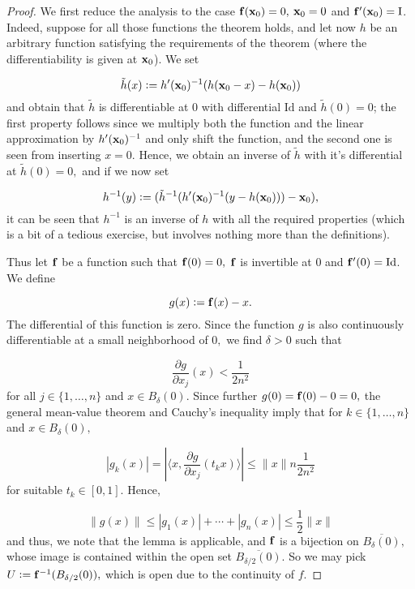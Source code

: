 \begin{proof}
We first reduce the analysis  to the case \(\mathbf{ f}(\mathbf{ x}_0) = 0,\) \(\mathbf{ x}_0 = 0\) and
\(\mathbf{ f}'(\mathbf{ x}_0) = \text{I}\). Indeed, suppose for all those functions the
theorem holds, and let now \(h\) be an arbitrary function satisfying the
requirements of the theorem (where the differentiability is given at
\(\mathbf{ x}_0\)). We set

\[\tilde h(x) := h'(\mathbf{ x}_0)^{-1}(h(\mathbf{ x}_0 - x) - h(\mathbf{ x}_0))\] and obtain that
\(\tilde h\) is differentiable at \(0\) with differential \(\text{Id}\)
and \(\tilde h(0) = 0\); the first property follows since we multiply
both the function and the linear approximation by
\(h'(\mathbf{ x}_0)^{-1}\) and only shift the function, and the second one is seen
from inserting \(x = 0\). Hence, we obtain an inverse of \(\tilde h\)
with it's differential at \(\tilde h(0) = 0,\) and if we now set

\[h^{-1}(y) :=  (\tilde h^{-1} (h'(\mathbf{ x}_0)^{-1}(y - h(\mathbf{ x}_0))) - \mathbf{ x}_0),\] it
can be seen that \(h^{-1}\) is an inverse of \(h\) with all the required
properties (which is a bit of a tedious exercise, but involves nothing
more than the definitions).

Thus let \(\mathbf{ f}\) be a function such that \(\mathbf{ f}(0) = 0,\) \(\mathbf{ f}\) is invertible
at \(0\) and \(\mathbf{ f}'(0) = \text{Id}\). We define

\[g(x) := \mathbf{ f}(x) - x.\] The differential of this function is zero. Since the function \(g\) is also
continuously differentiable at a small neighborhood of \(0,\) we find
\(\delta > 0\) such that

\[\frac{\partial g}{\partial x_j}(x) < \frac{1}{2n^2}\] for all
\(j \in \{1, \ldots, n\}\) and \(x \in B_\delta(0)\). Since further
\(g(0) = \mathbf{ f}(0) - 0 = 0,\) the general mean-value theorem and Cauchy's
inequality imply that for \(k \in \{1, \ldots, n\}\) and
\(x \in B_\delta(0),\)

\[|g_k(x)| = |\langle x, \frac{\partial g}{\partial x_j}(t_k x) \rangle| \le \|x\| n \frac{1}{2n^2}\]
for suitable \(t_k \in [0, 1]\). Hence,

\[\|g(x)\| \le |g_1(x)| + \cdots + |g_n(x)| \le \frac{1}{2} \|x\|\]
and thus, we note that the lemma is
applicable, and \(\mathbf{ f}\) is a bijection on \(\overline{B_\delta(0)},\)
whose image is contained within the open set
\(\overline{B_{\delta/2}(0)}\). So we may pick
\(U := \mathbf{ f}^{-1}(B_{\delta/2}(0)),\) which is open due to the continuity of
\(f\).


\end{proof}
